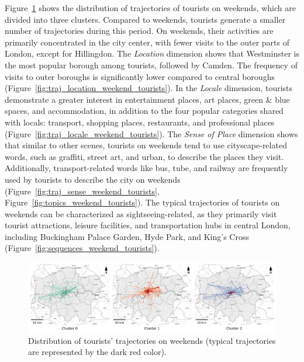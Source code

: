 \documentclass{article}
\theoremstyle{remark}
\begin{document}
Figure~\ref{fig:traj_distribution_weekend_tourists} shows the distribution of trajectories of tourists on weekends, which are divided into three clusters. Compared to weekends, tourists generate a smaller number of trajectories during this period. On weekends, their activities are primarily concentrated in the city center, with fewer visits to the outer parts of London, except for Hillingdon. The \textit{Location} dimension shows that Westminster is the most popular borough among tourists, followed by Camden. The frequency of visits to outer boroughs is significantly lower compared to central boroughs (Figure~\ref{fig:traj_location_weekend_tourists}). In the \textit{Locale} dimension, tourists demonstrate a greater interest in entertainment places, art places, green \& blue spaces, and accommodation, in addition to the four popular categories shared with locals: transport, shopping places, restaurants, and professional places (Figure~\ref{fig:traj_locale_weekend_tourists}). The \textit{Sense of Place} dimension shows that similar to other scenes, tourists on weekends tend to use cityscape-related words, such as graffiti, street art, and urban, to describe the places they visit. Additionally, transport-related words like bus, tube, and railway are frequently used by tourists to describe the city on weekends (Figure~\ref{fig:traj_sense_weekend_tourists}, Figure~\ref{fig:topics_weekend_tourists}). The typical trajectories of tourists on weekends can be characterized as sightseeing-related, as they primarily visit tourist attractions, leisure facilities, and transportation hubs in central London, including Buckingham Palace Garden, Hyde Park, and King's Cross (Figure~\ref{fig:sequences_weekend_tourists}).

\begin{figure}[!h]
\centering
\includegraphics[width=1\textwidth]{figures/traj_distribution_weekend_tourists.png}
\caption{\label{fig:traj_distribution_weekend_tourists}Distribution of tourists' trajectories on weekends (typical trajectories are represented by the dark red color).}
\end{figure}
\end{document}
